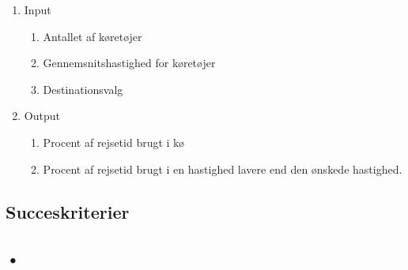 \begin{enumerate}
\begin{description}
    \end{description}
    \begin{enumerate}
    \item Input
        \begin{enumerate}
        \item Antallet af køretøjer
        \item Gennemsnitshastighed for køretøjer
        \item Destinationsvalg
        \end{enumerate}
    \item Output
        \begin{enumerate}
        \item Procent af rejsetid brugt i kø
        \item Procent af rejsetid brugt i en hastighed lavere end den ønskede hastighed.
        \end{enumerate}
    \end{enumerate}
\end{enumerate}

\subsection{Succeskriterier}\label{Succeskriterier}

\subsection{•}
